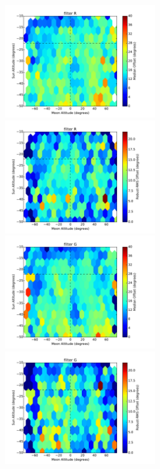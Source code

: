 \documentclass[]{spie}
\begin{document}
\begin{figure}
  \includegraphics[height=5cm]{plots/medianAngDiff_R_.pdf}\includegraphics[height=5cm]{plots/rmsAngDiff_R_.pdf}
  \includegraphics[height=5cm]{plots/medianAngDiff_G_.pdf}\includegraphics[height=5cm]{plots/rmsAngDiff_G_.pdf}

\end{figure}
\end{document}

